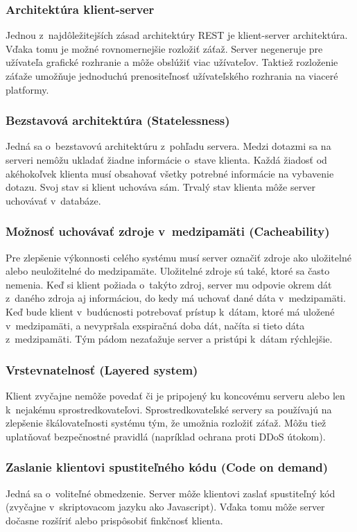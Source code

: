 \documentclass[slovak]{fitthesis}
\begin{document}
\subsubsection{Architektúra klient-server}
Jednou z~najdôležitejších zásad architektúry REST je klient-server architektúra. Vďaka tomu je možné rovnomernejšie rozložiť záťaž. Server negeneruje pre užívateľa grafické rozhranie a môže obslúžiť viac užívateľov. Taktiež rozloženie záťaže umožňuje jednoduchú prenositeľnosť užívateľského rozhrania na viaceré platformy.

\subsubsection{Bezstavová architektúra (Statelessness)}
Jedná sa o~bezstavovú architektúru z~pohľadu servera. Medzi dotazmi sa na serveri nemôžu ukladať žiadne informácie o~stave klienta. Každá žiadosť od akéhokoľvek klienta musí obsahovať všetky potrebné informácie na vybavenie dotazu. Svoj stav si klient uchováva sám. Trvalý stav klienta môže server uchovávať v~databáze.

\subsubsection{Možnosť uchovávať zdroje v~medzipamäti (Cacheability)}
Pre zlepšenie výkonnosti celého systému musí server označiť zdroje ako uložitelné alebo neuložitelné do medzipamäte. Uložitelné zdroje sú také, ktoré sa často nemenia. Keď si klient požiada o~takýto zdroj, server mu odpovie okrem dát z~daného zdroja aj informáciou, do kedy má uchovať dané dáta v~medzipamäti. Keď bude klient v~budúcnosti potrebovať prístup k~dátam, ktoré má uložené v~medzipamäti, a nevypršala exspiračná doba dát, načíta si tieto dáta z~medzipamäti. Tým pádom nezaťažuje server a pristúpi k~dátam rýchlejšie. 

\subsubsection{Vrstevnatelnosť (Layered system)}
Klient zvyčajne nemôže povedať či je pripojený ku koncovému serveru alebo len k~nejakému sprostredkovateľovi. Sprostredkovateľské servery sa používajú na zlepšenie škálovateľnosti systému tým, že umožnia rozložiť záťaž. Môžu tiež uplatňovať bezpečnostné pravidlá (napríklad ochrana proti DDoS útokom).

\subsubsection{Zaslanie klientovi spustiteľného kódu (Code on demand)}
Jedná sa o~voliteľné obmedzenie. Server môže klientovi zaslať spustiteľný kód (zvyčajne v~skriptovacom jazyku ako Javascript). Vďaka tomu môže server dočasne rozšíriť alebo prispôsobiť finkčnosť klienta.
\end{document}
